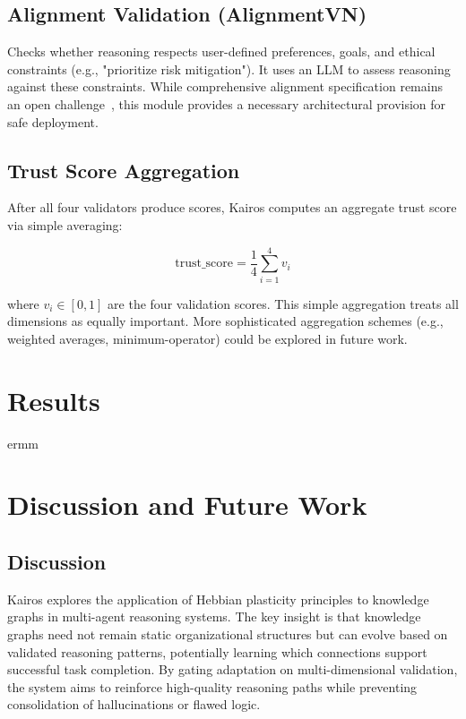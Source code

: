 \documentclass{article}
\begin{document}
\subsection{Alignment Validation (AlignmentVN)}

Checks whether reasoning respects user-defined preferences, goals, and ethical constraints (e.g., "prioritize risk mitigation"). It uses an LLM to assess reasoning against these constraints. While comprehensive alignment specification remains an open challenge~\citep{pan2024unifying}, this module provides a necessary architectural provision for safe deployment.

\subsection{Trust Score Aggregation}

After all four validators produce scores, Kairos computes an aggregate trust score via simple averaging:

\begin{equation}
\text{trust\_score} = \frac{1}{4} \sum_{i=1}^{4} v_i
\end{equation}

where $v_i \in [0,1]$ are the four validation scores. This simple aggregation treats all dimensions as equally important. More sophisticated aggregation schemes (e.g., weighted averages, minimum-operator) could be explored in future work.
\section{Results}

ermm

\section{Discussion and Future Work}
\label{sec:discussion}

\subsection{Discussion}

Kairos explores the application of Hebbian plasticity principles to knowledge graphs in multi-agent reasoning systems. The key insight is that knowledge graphs need not remain static organizational structures but can evolve based on validated reasoning patterns, potentially learning which connections support successful task completion. By gating adaptation on multi-dimensional validation, the system aims to reinforce high-quality reasoning paths while preventing consolidation of hallucinations or flawed logic.
\end{document}
